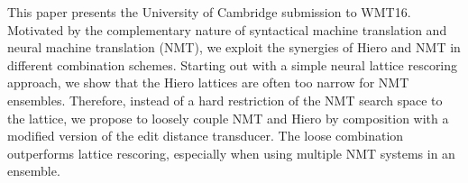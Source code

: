 This paper presents the University of Cambridge submission to WMT16. Motivated by the complementary nature of syntactical machine translation and neural machine translation (NMT), we exploit the synergies of Hiero and NMT in different combination schemes. Starting out with a simple neural lattice rescoring approach, we show that the Hiero lattices are often too narrow for NMT ensembles. Therefore, instead of a hard restriction of the NMT search space to the lattice, we propose to loosely couple NMT and Hiero by composition with a modified version of the edit distance transducer. The loose combination outperforms lattice rescoring, especially when using multiple NMT systems in an ensemble.
